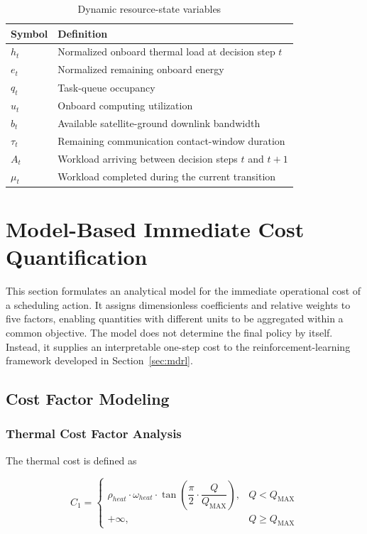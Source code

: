 \documentclass[lettersize,journal]{IEEEtran}
\begin{document}
\begin{table}[htbp]
\centering
\caption{Dynamic resource-state variables}
\label{tab:dynamic_states}
\begin{tabular}{p{1.4cm}p{5.3cm}}
\toprule
\textbf{Symbol} & \textbf{Definition} \\
\midrule
$h_t$ & Normalized onboard thermal load at decision step $t$ \\
$e_t$ & Normalized remaining onboard energy \\
$q_t$ & Task-queue occupancy \\
$u_t$ & Onboard computing utilization \\
$b_t$ & Available satellite-ground downlink bandwidth \\
$\tau_t$ & Remaining communication contact-window duration \\
$A_t$ & Workload arriving between decision steps $t$ and $t+1$ \\
$\mu_t$ & Workload completed during the current transition \\
\bottomrule
\end{tabular}
\end{table}

\section{Model-Based Immediate Cost Quantification}
\label{sec:cost_modeling}

This section formulates an analytical model for the immediate operational cost of a scheduling action. It assigns dimensionless coefficients and relative weights to five factors, enabling quantities with different units to be aggregated within a common objective. The model does not determine the final policy by itself. Instead, it supplies an interpretable one-step cost to the reinforcement-learning framework developed in Section~\ref{sec:mdrl}.

\subsection{Cost Factor Modeling}

\subsubsection{Thermal Cost Factor Analysis}

The thermal cost is defined as

\begin{equation}
C_{1} =
\begin{cases}
\rho_{heat} \cdot \omega_{heat} \cdot \tan \!\left( \dfrac{\pi}{2} \cdot \dfrac{Q}{Q_{\text{MAX}}} \right), & Q < Q_{\text{MAX}} \\[10pt]
+\infty, & Q \geq Q_{\text{MAX}}
\end{cases}
\label{eq:heat_cost}
\end{equation}
\end{document}

